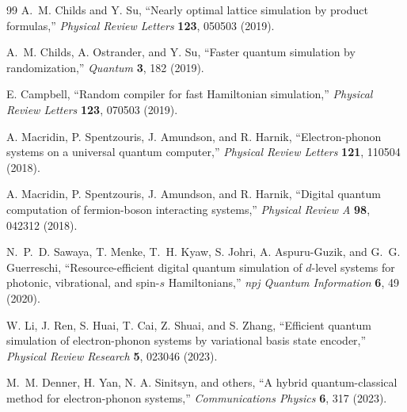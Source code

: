 \documentclass[
  reprint,
  amsmath,
  amssymb,
  aps,
  pra,
  nofootinbib,
  superscriptaddress,
  floatfix
]{revtex4-2}
\begin{document}
\begin{thebibliography}{99}
A.~M. Childs and Y. Su,
``Nearly optimal lattice simulation by product formulas,''
\emph{Physical Review Letters} \textbf{123}, 050503 (2019).

A.~M. Childs, A. Ostrander, and Y. Su,
``Faster quantum simulation by randomization,''
\emph{Quantum} \textbf{3}, 182 (2019).

E. Campbell,
``Random compiler for fast Hamiltonian simulation,''
\emph{Physical Review Letters} \textbf{123}, 070503 (2019).

A. Macridin, P. Spentzouris, J. Amundson, and R. Harnik,
``Electron-phonon systems on a universal quantum computer,''
\emph{Physical Review Letters} \textbf{121}, 110504 (2018).

A. Macridin, P. Spentzouris, J. Amundson, and R. Harnik,
``Digital quantum computation of fermion-boson interacting systems,''
\emph{Physical Review A} \textbf{98}, 042312 (2018).

N.~P.~D. Sawaya, T. Menke, T.~H. Kyaw, S. Johri, A. Aspuru-Guzik, and G.~G. Guerreschi,
``Resource-efficient digital quantum simulation of $d$-level systems for photonic, vibrational, and spin-$s$ Hamiltonians,''
\emph{npj Quantum Information} \textbf{6}, 49 (2020).

W. Li, J. Ren, S. Huai, T. Cai, Z. Shuai, and S. Zhang,
``Efficient quantum simulation of electron-phonon systems by variational basis state encoder,''
\emph{Physical Review Research} \textbf{5}, 023046 (2023).

M.~M. Denner, H. Yan, N. A. Sinitsyn, and others,
``A hybrid quantum-classical method for electron-phonon systems,''
\emph{Communications Physics} \textbf{6}, 317 (2023).

\end{thebibliography}
\end{document}
